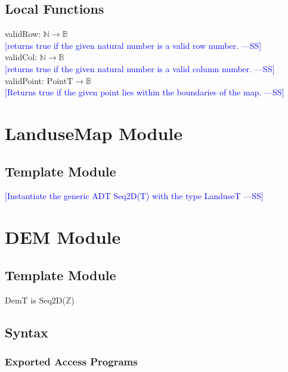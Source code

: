 \documentclass[12pt]{article}
\newcommand{\authornote}[3]{\textcolor{#1}{[#3 ---#2]}}
\newcommand{\authornote}[3]{}
\newcommand{\wss}[1]{\authornote{blue}{SS}{#1}}
\begin{document}
\subsection*{Local Functions}

\noindent validRow: $\mathbb{N} \rightarrow \mathbb{B}$\\
\noindent \wss{returns true if the given natural number is a valid row
  number.}\\

\noindent validCol: $\mathbb{N} \rightarrow \mathbb{B}$\\
\noindent \wss{returns true if the given natural number is a valid column
  number.}\\

\noindent validPoint: $\mbox{PointT} \rightarrow \mathbb{B}$\\
\noindent \wss{Returns true if the given point lies within the boundaries of the
  map.}\\

\newpage

\section* {LanduseMap Module}

\subsection* {Template Module}

\wss{Instantiate the generic ADT Seq2D(T) with the type LanduseT}

\newpage

\section* {DEM Module}

\subsection* {Template Module}

DemT is Seq2D($\mathbb{Z}$)

\subsection* {Syntax}

\subsubsection* {Exported Access Programs}
\end{document}
